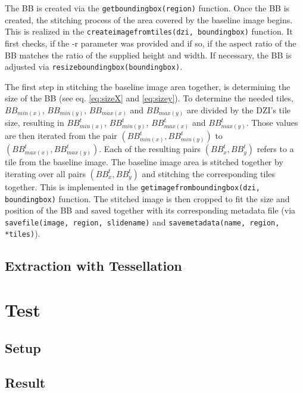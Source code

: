 The BB is created via the \texttt{get{\textunderscore}bounding{\textunderscore}box(region)} function. Once the BB is created, the stitching process of the area covered by the baseline image begins. This is realized in the \texttt{create{\textunderscore}image{\textunderscore}from{\textunderscore}tiles(dzi, bounding{\textunderscore}box)} function. It first checks, if the -r parameter was provided and if so, if the aspect ratio of the BB matches the ratio of the supplied height and width. If necessary, the BB is adjusted via \texttt{resize{\textunderscore}bounding{\textunderscore}box(bounding{\textunderscore}box)}.
 
The first step in stitching the baseline image area together, is determining the size of the BB (see eq. \ref{eq:sizeX} and \ref{eq:sizey}). To determine the needed tiles, $BB_{min(x)}$, $BB_{min(y)}$, $BB_{max(x)}$ and $BB_{max(y)}$ are divided by the DZI's tile size, resulting in $BB_{min(x)}^t$, $BB_{min(y)}^t$, $BB_{max(x)}^t$ and $BB_{max(y)}^t$. Those values are then iterated from the pair $(BB_{min(x)}^t, BB_{min(y)}^t)$ to $(BB_{max(x)}^t, BB_{max(y)}^t)$. Each of the resulting pairs $(BB_x^t, BB_y^t)$ refers to a tile from the baseline image. The baseline image area is stitched together by iterating over all pairs $(BB_x^t, BB_y^t)$ and stitching the corresponding tiles together. This is implemented in the \texttt{get{\textunderscore}image{\textunderscore}from{\textunderscore}bounding{\textunderscore}box(dzi, bounding{\textunderscore}box)} function. The stitched image is then cropped to fit the size and position of the BB and saved together with its corresponding metadata file (via \texttt{save{\textunderscore}file(image, region, slide{\textunderscore}name)} and \texttt{save{\textunderscore}metadata(name, region, *tiles)}).


\subsection{Extraction with Tessellation}
\label{sec5_tessellation}

\section{Test}
\subsection{Setup}
\subsection{Result}
